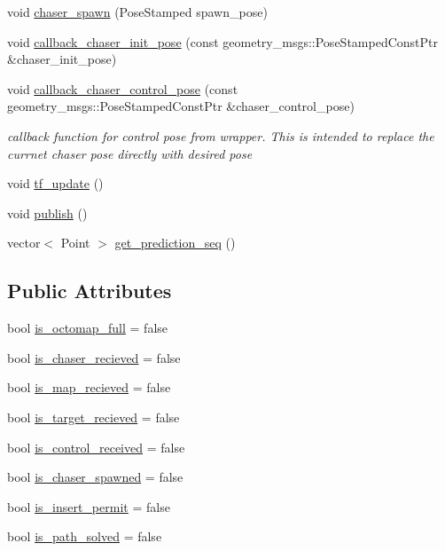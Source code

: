 \begin{DoxyCompactItemize}
\item 
void \hyperlink{class_objects_handler_a968feba95e0707919b6c3632781510ba}{chaser\+\_\+spawn} (Pose\+Stamped spawn\+\_\+pose)
\item 
void \hyperlink{class_objects_handler_a4c56416d3583b70d181d69d900b884b5}{callback\+\_\+chaser\+\_\+init\+\_\+pose} (const geometry\+\_\+msgs\+::\+Pose\+Stamped\+Const\+Ptr \&chaser\+\_\+init\+\_\+pose)
\item 
void \hyperlink{class_objects_handler_a28ac9c7ef998a413825cddca78324f61}{callback\+\_\+chaser\+\_\+control\+\_\+pose} (const geometry\+\_\+msgs\+::\+Pose\+Stamped\+Const\+Ptr \&chaser\+\_\+control\+\_\+pose)
\begin{DoxyCompactList}\small\item\em callback function for control pose from wrapper. This is intended to replace the currnet chaser pose directly with desired pose \end{DoxyCompactList}\item 
void \hyperlink{class_objects_handler_a6896e4f9863bd1a4fbc8498d0cb20f09}{tf\+\_\+update} ()
\item 
void \hyperlink{class_objects_handler_a16cf7fca3059a03da4ec795f2af7fb74}{publish} ()
\item 
vector$<$ Point $>$ \hyperlink{class_objects_handler_a4793f1ed257c849b28f0386f635ee714}{get\+\_\+prediction\+\_\+seq} ()
\end{DoxyCompactItemize}
\subsection*{Public Attributes}
\begin{DoxyCompactItemize}
\item 
bool \hyperlink{class_objects_handler_a56f70ac04c01e8b948a4b44fa5670f49}{is\+\_\+octomap\+\_\+full} = false
\item 
bool \hyperlink{class_objects_handler_a86f8528ff5697c87fc6a3fcd6ba0f42c}{is\+\_\+chaser\+\_\+recieved} = false
\item 
bool \hyperlink{class_objects_handler_acf1ef1b318defc2a39d87cea72689478}{is\+\_\+map\+\_\+recieved} = false
\item 
bool \hyperlink{class_objects_handler_a7691f3e1ec58e55ead30c50c555f169a}{is\+\_\+target\+\_\+recieved} = false
\item 
bool \hyperlink{class_objects_handler_a88fb913340c535df81f3b7ae5f06df61}{is\+\_\+control\+\_\+received} = false
\item 
bool \hyperlink{class_objects_handler_a16165ae7c0167ba8d2a0151a8a4fbfd5}{is\+\_\+chaser\+\_\+spawned} = false
\item 
bool \hyperlink{class_objects_handler_acaefe98eb412d4c32cda2bf0bd602ae7}{is\+\_\+insert\+\_\+permit} = false
\item 
bool \hyperlink{class_objects_handler_ad8d1ea6646024f0a03e154a7c2c07682}{is\+\_\+path\+\_\+solved} = false
\end{DoxyCompactItemize}



